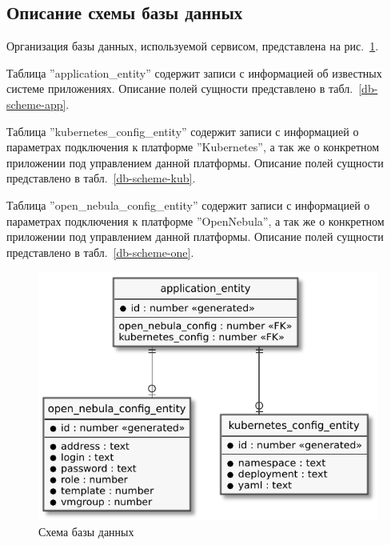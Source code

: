 \subsection{Описание схемы базы данных}
Организация базы данных, используемой сервисом, представлена на рис.~\ref{db-scheme}.

Таблица ''application\_entity'' содержит записи с информацией об известных системе приложениях.
Описание полей сущности представлено в табл.~\ref{db-scheme-app}.

Таблица ''kubernetes\_config\_entity'' содержит записи с информацией о параметрах подключения к платформе ''Kubernetes'', а так же о конкретном приложении под управлением данной платформы.
Описание полей сущности представлено в табл.~\ref{db-scheme-kub}.

Таблица ''open\_nebula\_config\_entity''  содержит записи с информацией о параметрах подключения к платформе ''OpenNebula'', а так же о конкретном приложении под управлением данной платформы.
Описание полей сущности представлено в табл.~\ref{db-scheme-one}.

\begin{figure}[hbtp]
    \centering
    \includegraphics[width=13cm]{img/db-scheme.pdf}
    \caption{Схема базы данных}
    \label{db-scheme}
\end{figure}

